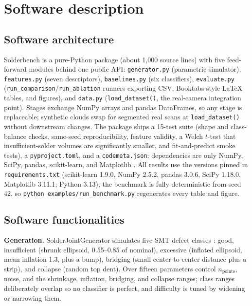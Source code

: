 \documentclass[3p]{elsarticle}
\begin{document}
\section{Software description}
\subsection{Software architecture}
Solderbench is a pure-Python package (about 1,000 source lines) with five feed-forward modules behind one public API: \texttt{generator.py} (parametric simulator), \texttt{features.py} (seven descriptors), \texttt{baselines.py} (six classifiers), \texttt{evaluate.py} (\texttt{run\_comparison}/\texttt{run\_ablation} runners exporting CSV, Booktabs-style LaTeX tables, and figures), and \texttt{data.py} (\texttt{load\_dataset()}, the real-camera integration point). Stages exchange NumPy arrays and pandas DataFrames, so any stage is replaceable; synthetic clouds swap for segmented real scans at \texttt{load\_dataset()} without downstream changes. The package ships a 15-test suite (shape and class-balance checks, same-seed reproducibility, feature validity, a Welch $t$-test that insufficient-solder volumes are significantly smaller, and fit-and-predict smoke tests), a \texttt{pyproject.toml}, and a \texttt{codemeta.json}; dependencies are only NumPy, SciPy, pandas, scikit-learn, and Matplotlib \cite{ref14,ref15,ref16,ref17}. All results use the versions pinned in \texttt{requirements.txt} (scikit-learn 1.9.0, NumPy 2.5.2, pandas 3.0.6, SciPy 1.18.0, Matplotlib 3.11.1; Python 3.13); the benchmark is fully deterministic from seed 42, so \texttt{python examples/run\_benchmark.py} regenerates every table and figure.
\subsection{Software functionalities}
\textbf{Generation. }SolderJointGenerator simulates five SMT defect classes \cite{ref6,ref7}: good, insufficient (shrunk ellipsoid, 0.55--0.85 of nominal), excessive (inflated ellipsoid, mean inflation 1.3, plus a bump), bridging (small center-to-center distance plus a strip), and collapse (random top dent). Over fifteen parameters control $n_{\mathrm{points}}$, noise, and the shrinkage, inflation, bridging, and collapse ranges; class ranges deliberately overlap so no classifier is perfect, and difficulty is tuned by widening or narrowing them.
\end{document}
